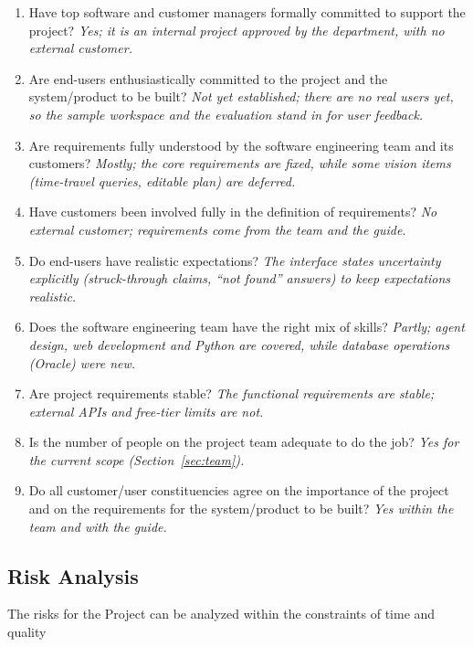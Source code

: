 \begin{enumerate}
\item Have top software and customer managers formally committed to support the project? \emph{Yes; it is an internal project approved by the department, with no external customer.}
\item Are end-users enthusiastically committed to the project and the system/product to be built? \emph{Not yet established; there are no real users yet, so the sample workspace and the evaluation stand in for user feedback.}
\item Are requirements fully understood by the software engineering team and its customers? \emph{Mostly; the core requirements are fixed, while some vision items (time-travel queries, editable plan) are deferred.}
\item Have customers been involved fully in the definition of requirements? \emph{No external customer; requirements come from the team and the guide.}
\item Do end-users have realistic expectations? \emph{The interface states uncertainty explicitly (struck-through claims, ``not found'' answers) to keep expectations realistic.}
\item Does the software engineering team have the right mix of skills? \emph{Partly; agent design, web development and Python are covered, while database operations (Oracle) were new.}
\item Are project requirements stable? \emph{The functional requirements are stable; external APIs and free-tier limits are not.}
\item Is the number of people on the project team adequate to do the job? \emph{Yes for the current scope (Section~\ref{sec:team}).}
\item Do all customer/user constituencies agree on the importance of the project and on the requirements for the system/product to be built? \emph{Yes within the team and with the guide.}
\end{enumerate}

\subsection{Risk Analysis}
The risks for the Project can be analyzed within the constraints of time and quality

